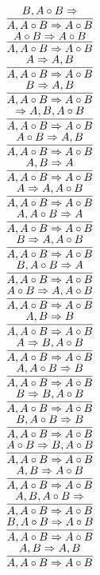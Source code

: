 \documentclass[11pt]{article}
\begin{document}
\begin{center}
\bigskip
\\$\infer{A, A\circ B\Rightarrow A\circ B}{B, A\circ B\Rightarrow }$
\bigskip
\\$\infer{A, A\circ B\Rightarrow A\circ B}{A\circ B\Rightarrow A\circ B}$
\bigskip
\\$\infer{A, A\circ B\Rightarrow A\circ B}{A\Rightarrow A, B}$
\bigskip
\\$\infer{A, A\circ B\Rightarrow A\circ B}{B\Rightarrow A, B}$
\bigskip
\\$\infer{A, A\circ B\Rightarrow A\circ B}{\Rightarrow A, B, A\circ B}$
\bigskip
\\$\infer{A, A\circ B\Rightarrow A\circ B}{A\circ B\Rightarrow A, B}$
\bigskip
\\$\infer{A, A\circ B\Rightarrow A\circ B}{A, B\Rightarrow A}$
\bigskip
\\$\infer{A, A\circ B\Rightarrow A\circ B}{A\Rightarrow A, A\circ B}$
\bigskip
\\$\infer{A, A\circ B\Rightarrow A\circ B}{A, A\circ B\Rightarrow A}$
\bigskip
\\$\infer{A, A\circ B\Rightarrow A\circ B}{B\Rightarrow A, A\circ B}$
\bigskip
\\$\infer{A, A\circ B\Rightarrow A\circ B}{B, A\circ B\Rightarrow A}$
\bigskip
\\$\infer{A, A\circ B\Rightarrow A\circ B}{A\circ B\Rightarrow A, A\circ B}$
\bigskip
\\$\infer{A, A\circ B\Rightarrow A\circ B}{A, B\Rightarrow B}$
\bigskip
\\$\infer{A, A\circ B\Rightarrow A\circ B}{A\Rightarrow B, A\circ B}$
\bigskip
\\$\infer{A, A\circ B\Rightarrow A\circ B}{A, A\circ B\Rightarrow B}$
\bigskip
\\$\infer{A, A\circ B\Rightarrow A\circ B}{B\Rightarrow B, A\circ B}$
\bigskip
\\$\infer{A, A\circ B\Rightarrow A\circ B}{B, A\circ B\Rightarrow B}$
\bigskip
\\$\infer{A, A\circ B\Rightarrow A\circ B}{A\circ B\Rightarrow B, A\circ B}$
\bigskip
\\$\infer{A, A\circ B\Rightarrow A\circ B}{A, B\Rightarrow A\circ B}$
\bigskip
\\$\infer{A, A\circ B\Rightarrow A\circ B}{A, B, A\circ B\Rightarrow }$
\bigskip
\\$\infer{A, A\circ B\Rightarrow A\circ B}{B, A\circ B\Rightarrow A\circ B}$
\bigskip
\\$\infer{A, A\circ B\Rightarrow A\circ B}{A, B\Rightarrow A, B}$

\end{center}
\end{document}
